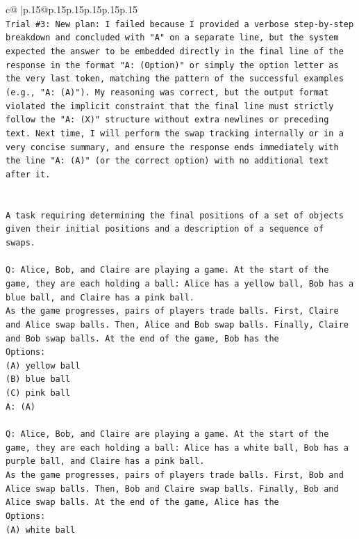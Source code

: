 \documentclass{article}
\begin{document}
{\begin{supertabular}{c@{$\;$}|p{.15\linewidth}@{}p{.15\linewidth}p{.15\linewidth}p{.15\linewidth}p{.15\linewidth}p{.15\linewidth}}
{{{\\ 
\texttt{Trial \#3: New plan: I failed because I provided a verbose step{-}by{-}step breakdown and concluded with "A" on a separate line, but the system expected the answer to be embedded directly in the final line of the response in the format "A: (Option)" or simply the option letter as the very last token, matching the pattern of the successful examples (e.g., "A: (A)"). My reasoning was correct, but the output format violated the implicit constraint that the final line must strictly follow the "A: (X)" structure without extra newlines or preceding text. Next time, I will perform the swap tracking internally or in a very concise summary, and ensure the response ends immediately with the line "A: (A)" (or the correct option) with no additional text after it.} \\
\\ 
\\ 
\texttt{A task requiring determining the final positions of a set of objects given their initial positions and a description of a sequence of swaps.} \\
\\ 
\texttt{Q: Alice, Bob, and Claire are playing a game. At the start of the game, they are each holding a ball: Alice has a yellow ball, Bob has a blue ball, and Claire has a pink ball.} \\
\texttt{As the game progresses, pairs of players trade balls. First, Claire and Alice swap balls. Then, Alice and Bob swap balls. Finally, Claire and Bob swap balls. At the end of the game, Bob has the} \\
\texttt{Options:} \\
\texttt{(A) yellow ball} \\
\texttt{(B) blue ball} \\
\texttt{(C) pink ball} \\
\texttt{A: (A)} \\
\\ 
\texttt{Q: Alice, Bob, and Claire are playing a game. At the start of the game, they are each holding a ball: Alice has a white ball, Bob has a purple ball, and Claire has a pink ball.} \\
\texttt{As the game progresses, pairs of players trade balls. First, Bob and Alice swap balls. Then, Bob and Claire swap balls. Finally, Bob and Alice swap balls. At the end of the game, Alice has the} \\
\texttt{Options:} \\
\texttt{(A) white ball} \\
}}}
\end{supertabular}}
\end{document}
